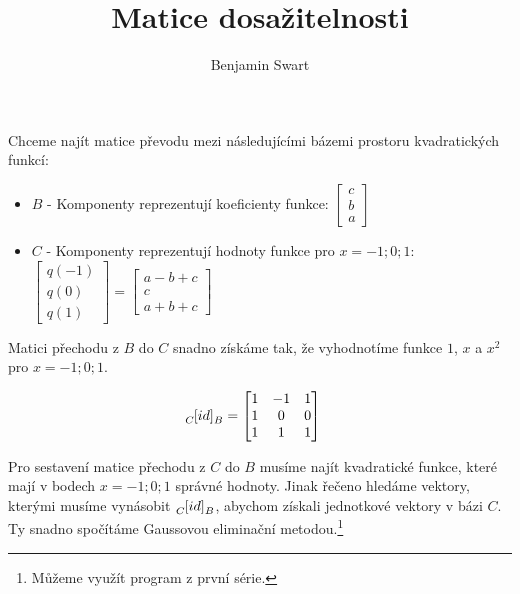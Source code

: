 \documentclass{article}
\title{Matice dosažitelnosti}
\author{Benjamin Swart}
\begin{document}
Chceme najít matice převodu mezi následujícími bázemi prostoru kvadratických funkcí:

\begin{itemize}
    \item $B$ - Komponenty reprezentují koeficienty funkce: $
              \begin{bmatrix}
                  c \\
                  b \\
                  a
              \end{bmatrix}
          $
    \item $C$ - Komponenty reprezentují hodnoty funkce pro $x = -1; 0; 1$: $
              \begin{bmatrix}
                  q(-1) \\
                  q(0)  \\
                  q(1)
              \end{bmatrix}
              =
              \begin{bmatrix}
                  a - b + c \\
                  c         \\
                  a + b + c
              \end{bmatrix}
          $
\end{itemize}

Matici přechodu z $B$ do $C$ snadno získáme tak, že vyhodnotíme funkce $1$, $x$ a $x^2$ pro $x = -1; 0; 1$.

\begin{align*}
    \tensor[_C]{[id]}{_B} & = \begin{bmatrix}
                                  1 & -1 & 1 \\
                                  1 & 0  & 0 \\
                                  1 & 1  & 1
                              \end{bmatrix}
\end{align*}

Pro sestavení matice přechodu z $C$ do $B$ musíme najít kvadratické funkce, které mají v bodech $x = -1; 0; 1$ správné hodnoty. Jinak řečeno hledáme vektory, kterými musíme vynásobit $\tensor[_C]{[id]}{_B}$, abychom získali jednotkové vektory v bázi $C$. Ty snadno spočítáme Gaussovou eliminační metodou.\footnote{Můžeme využít program z první série.}
\end{document}
